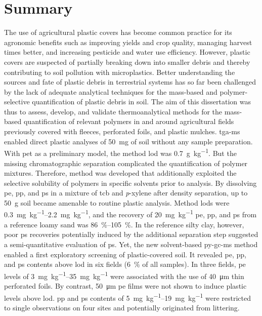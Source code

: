 
\chapter{Summary}

The use of agricultural plastic covers has become common practice for its agronomic benefits such as improving yields and crop quality, managing harvest times better, and increasing pesticide and water use efficiency. However, plastic covers are suspected of partially breaking down into smaller debris and thereby contributing to soil pollution with microplastics.
Better understanding the sources and fate of plastic debris in terrestrial systems has so far been challenged by the lack of adequate analytical techniques for the mass-based and polymer-selective quantification of plastic debris in soil. The aim of this dissertation was thus to assess, develop, and validate thermoanalytical methods for the mass-based quantification of relevant polymers in and around agricultural fields previously covered with fleeces, perforated foils, and plastic mulches.
\Ac{tga-ms} enabled direct plastic analyses of \SI{50}{\milli\gram} of soil without any sample preparation. With \ac{pet} as a preliminary model, the method \ac{lod} was \SI{0.7}{\gram\per\kilo\gram}. But the missing chromatographic separation complicated the quantification of polymer mixtures. Therefore,  method was developed that additionally exploited the selective solubility of polymers in specific solvents prior to analysis. By dissolving \ac{pe}, \ac{pp}, and \ac{ps} in a mixture of \acl{tcb} and \textit{p}-xylene after density separation, up to \SI{50}{\gram} soil became amenable to routine plastic analysis. Method \acp{lod} were \SIrange{0.3}{2.2}{\milli\gram\per\kilo\gram}, and the recovery of \SI{20}{\milli\gram\per\kilo\gram} \ac{pe}, \ac{pp}, and \ac{ps} from a reference loamy sand was \SIrange{86}{105}{\percent}. In the reference silty clay, however, poor \ac{ps} recoveries potentially induced by
the additional separation step suggested a semi-quantitative evaluation of \ac{ps}.
Yet, the new solvent-based \ac{py-gc-ms} method enabled a first exploratory screening of plastic-covered soil. It revealed \ac{pe}, \ac{pp}, and \ac{ps} contents above \ac{lod} in six fields (\SI{6}{\percent} of all samples). In three fields, \ac{pe} levels of \SIrange{3}{35}{\milli\gram\per\kilo\gram} were associated with the use of \SI{40}{\micro\meter} thin perforated foils. By contrast, \SI{50}{\micro\meter} \ac{pe} films were not shown to induce plastic levels above \ac{lod}. \Ac{pp} and \ac{ps} contents of \SIrange{5}{19}{\milli\gram\per\kilo\gram} were restricted to single observations on four sites and potentially originated from littering. 
